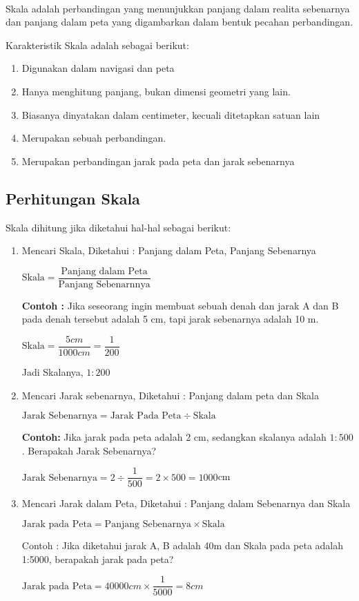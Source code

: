 \paragraph*{}
	Skala adalah perbandingan yang menunjukkan panjang dalam realita sebenarnya dan panjang dalam peta yang digambarkan dalam bentuk pecahan perbandingan.\par
	Karakteristik Skala adalah sebagai berikut:
	\begin{enumerate}
		\item Digunakan dalam navigasi dan peta
		\item Hanya menghitung panjang, bukan dimensi geometri yang lain.
		\item Biasanya dinyatakan dalam centimeter, kecuali ditetapkan satuan lain
		\item Merupakan sebuah perbandingan.
		\item Merupakan perbandingan jarak pada peta dan jarak sebenarnya
	\end{enumerate}
	\subsection{Perhitungan Skala}
	Skala dihitung jika diketahui hal-hal sebagai berikut:
	\begin{enumerate}
		\item Mencari Skala, Diketahui : Panjang dalam Peta, Panjang Sebenarnya
		\begin{center}
			$\text{Skala}=\dfrac{\text{Panjang dalam Peta}}{\text{Panjang Sebenarnnya}}$
		\end{center}
		
		\textbf{Contoh :} Jika seseorang ingin membuat sebuah denah dan jarak A dan B pada denah tersebut adalah 5 cm, tapi jarak sebenarnya adalah 10 m.
		\begin{center}
			$\text{Skala}=\dfrac{5 cm}{1000 cm}=\dfrac{1}{200}$
		\end{center}
		Jadi Skalanya, $1:200$		
		\item Mencari Jarak sebenarnya, Diketahui : Panjang dalam peta dan Skala
		\begin{center}
			$\text{Jarak Sebenarnya}=\text{Jarak Pada Peta} \div \text{Skala}$
		\end{center}
		\textbf{Contoh:} Jika jarak pada peta adalah 2 cm, sedangkan skalanya adalah $1: 500$. Berapakah Jarak Sebenarnya?
		\begin{center}
			$\text{Jarak Sebenarnya}=2 \div \dfrac{1}{500}=2 \times 500=1000$cm
		\end{center}
		
		\item Mencari Jarak dalam Peta, Diketahui : Panjang dalam Sebenarnya dan Skala
		\begin{center}
			$\text{Jarak pada Peta}= \text{Panjang Sebenarnya} \times \text{Skala}$
		\end{center}
		Contoh : Jika diketahui jarak A, B adalah 40m dan Skala pada peta adalah 1:5000, berapakah jarak pada peta?
		\begin{center}
			$\text{Jarak pada Peta}= 40000 cm \times \dfrac{1}{5000} = 8 cm$
		\end{center}
	\end{enumerate}